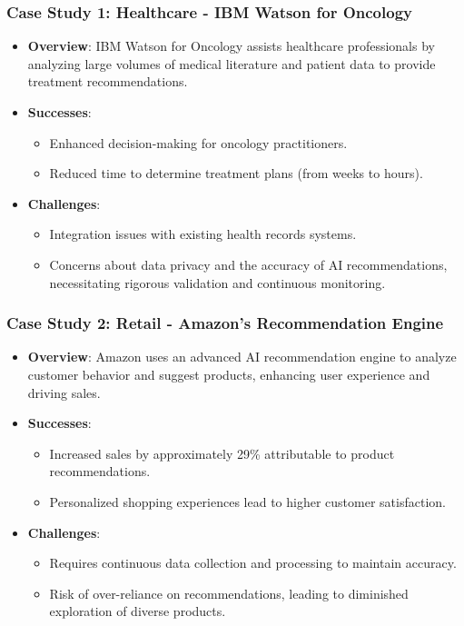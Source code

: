 \documentclass{beamer}
\begin{document}
\begin{frame}[fragile]
    \frametitle{Case Study 1: Healthcare - IBM Watson for Oncology}
    \begin{itemize}
        \item \textbf{Overview}: IBM Watson for Oncology assists healthcare professionals by analyzing large volumes of medical literature and patient data to provide treatment recommendations.
        \item \textbf{Successes}:
        \begin{itemize}
            \item Enhanced decision-making for oncology practitioners.
            \item Reduced time to determine treatment plans (from weeks to hours).
        \end{itemize}
        \item \textbf{Challenges}:
        \begin{itemize}
            \item Integration issues with existing health records systems.
            \item Concerns about data privacy and the accuracy of AI recommendations, necessitating rigorous validation and continuous monitoring.
        \end{itemize}
    \end{itemize}
\end{frame}

\begin{frame}[fragile]
    \frametitle{Case Study 2: Retail - Amazon's Recommendation Engine}
    \begin{itemize}
        \item \textbf{Overview}: Amazon uses an advanced AI recommendation engine to analyze customer behavior and suggest products, enhancing user experience and driving sales.
        \item \textbf{Successes}:
        \begin{itemize}
            \item Increased sales by approximately 29\% attributable to product recommendations.
            \item Personalized shopping experiences lead to higher customer satisfaction.
        \end{itemize}
        \item \textbf{Challenges}:
        \begin{itemize}
            \item Requires continuous data collection and processing to maintain accuracy.
            \item Risk of over-reliance on recommendations, leading to diminished exploration of diverse products.
        \end{itemize}
    \end{itemize}
\end{frame}
\end{document}
